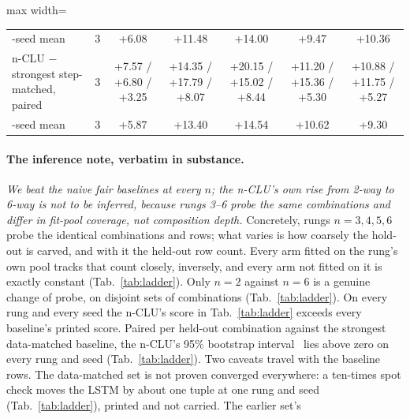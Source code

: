 \documentclass{article} %
\begin{document}
\begin{table}[t]
\begin{adjustbox}{max width=\linewidth}
\begin{tabular}{lcccccc}
\quad 3-seed mean & 3 & +6.08 & +11.48 & +14.00 & +9.47 & +10.36 \\
n-CLU $-$ strongest step-matched, paired & 3 & +7.57 / +6.80 / +3.25 & +14.35 / +17.79 / +8.07 & +20.15 / +15.02 / +8.44 & +11.20 / +15.36 / +5.30 & +10.88 / +11.75 / +5.27 \\
\quad 3-seed mean & 3 & +5.87 & +13.40 & +14.54 & +10.62 & +9.30 \\
\bottomrule
\end{tabular}\end{adjustbox}
\end{table}

\paragraph{The inference note, verbatim in substance.} \emph{We beat the naive fair baselines at
every $n$; the n-CLU's own rise from 2-way to 6-way is not to be inferred, because rungs 3--6
probe the same combinations and differ in fit-pool coverage, not composition depth.} Concretely,
rungs $n=3,4,5,6$ probe the identical combinations and rows; what varies is how
coarsely the hold-out is carved, and with it the held-out row count. Every arm fitted on the rung's own pool tracks that count closely,
inversely, and every arm not fitted on it is exactly constant (Tab.~\ref{tab:ladder}).
Only $n=2$ against $n=6$ is a genuine change of probe, on disjoint sets of combinations
(Tab.~\ref{tab:ladder}). %
On every rung and every seed the n-CLU's score in Tab.~\ref{tab:ladder} exceeds every baseline's
printed score. Paired per held-out combination against the strongest data-matched baseline, the n-CLU's 95\% %
bootstrap interval~\citep{efron_bootstrap_1979} lies above zero on every rung and seed
(Tab.~\ref{tab:ladder}). Two caveats travel with %
the baseline rows. The data-matched set is not proven converged everywhere: a ten-times spot check %
moves the LSTM by about one tuple at one rung and seed (Tab.~\ref{tab:ladder}), printed and not carried. The earlier set's %
\end{document}
